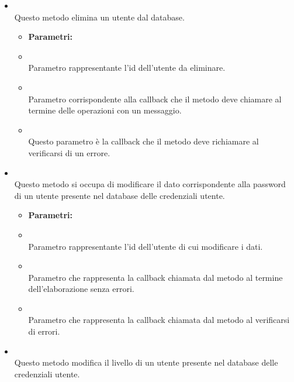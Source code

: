 \begin{itemize}
\begin{itemize}
\end{itemize}
\item[] \textbf{} \\ Questo metodo elimina un utente dal database.
\begin{itemize}\addtolength{\itemsep}{-0.5\baselineskip}
\item[] \textbf{Parametri:}
\item[]  \\ Parametro rappresentante l'id dell'utente da eliminare.
\item[]  \\ Parametro corrispondente alla callback che il metodo deve chiamare al termine delle operazioni con un messaggio.
\item[]  \\ Questo parametro è la callback che il metodo deve richiamare al verificarsi di un errore.
\end{itemize}
\item[] \textbf{} \\ Questo metodo si occupa di modificare il dato corrispondente alla password di un utente presente nel database delle credenziali utente.
\begin{itemize}\addtolength{\itemsep}{-0.5\baselineskip}
\item[] \textbf{Parametri:}
\item[]  \\ Parametro rappresentante l'id dell'utente di cui modificare i dati.
\item[]  \\ Parametro che rappresenta la callback chiamata dal metodo al termine dell'elaborazione senza errori.
\item[]  \\ Parametro che rappresenta la callback chiamata dal metodo al verificarsi di errori.
\end{itemize}
\item[] \textbf{} \\ Questo metodo modifica il livello di un utente presente nel database delle credenziali utente.
\begin{itemize}\addtolength{\itemsep}{-0.5\baselineskip}

\end{itemize}
\end{itemize}
